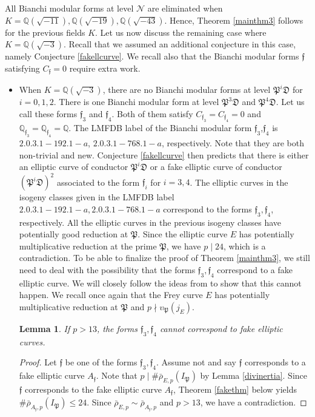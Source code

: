 \documentclass[]{article}
\newtheorem{lemma}{Lemma}
\newcommand {\QQ}{{\mathbb{Q}}}
\newcommand {\mfp}{{\mathfrak{P}}}
\begin{document}
All Bianchi modular forms at level $\mathcal{N}$ are eliminated when $K=\QQ(\sqrt{-11}),\QQ(\sqrt{-19}),\QQ(\sqrt{-43})$. Hence, Theorem \ref{mainthm3} follows for the previous fields $K$. Let us now discuss the remaining case where $K=\QQ(\sqrt{-3})$. Recall that we assumed an additional conjecture in this case, namely Conjecture \ref{fakellcurve}. We recall also that the Bianchi modular forms $\mathfrak{f}$ satisfying $C_\mathfrak{f}=0$ require extra work.

\begin{itemize}
    \item When $K=\QQ(\sqrt{-3})$, there are no Bianchi modular forms at level $\mfp^i\mathfrak{D}$ for $i=0,1,2$. There is one Bianchi modular form at level $\mfp^3\mathfrak{D}$ and $\mfp^4\mathfrak{D}$. Let us call these forms $\mathfrak{f}_3$ and $\mathfrak{f}_4$. Both of them satisfy $C_{\mathfrak{f}_3}=C_{\mathfrak{f}_4}=0$ and $\QQ_{\mathfrak{f}_3}=\QQ_{\mathfrak{f}_4}=\QQ$. The LMFDB label of the Bianchi modular form $\mathfrak{f}_3$,$\mathfrak{f}_4$ is $2.0.3.1-192.1-a$, $2.0.3.1-768.1-a$, respectively. Note that they are both non-trivial and new. Conjecture \ref{fakellcurve} then predicts that there is either an elliptic curve of conductor $\mfp^i\mathfrak{D}$ or a fake elliptic curve of conductor $(\mfp^i\mathfrak{D})^2$ associated to the form $\mathfrak{f}_i$ for $i=3,4$. The elliptic curves in the isogeny classes given in the LMFDB label $2.0.3.1-192.1-a,2.0.3.1-768.1-a$ correspond to the forms $\mathfrak{f}_3,\mathfrak{f}_4$, respectively. All the elliptic curves in the previous isogeny classes have potentially good reduction at $\mfp$. Since the elliptic curve $E$ has potentially multiplicative reduction at the prime $\mfp$, we have $p\mid 24$, which is a contradiction. To be able to finalize the proof of Theorem \ref{mainthm3}, we still need to deal with the possibility that the forms $\mathfrak{f}_3,\mathfrak{f}_4$ correspond to a fake elliptic curve. We will closely follow the ideas from \cite{csengun2018asymptotic} to show that this cannot happen. We recall once again that the Frey curve $E$ has potentially multiplicative reduction at $\mfp$ and $p\nmid v_{\mfp}(j_E)$.
    \begin{lemma}
        If $p> 13$, the forms $\mathfrak{f}_3,\mathfrak{f}_4$ cannot correspond to fake elliptic curves.
    \end{lemma}
    \begin{proof}
        Let $\mathfrak{f}$ be one of the forms $\mathfrak{f}_3,\mathfrak{f}_4$. Assume not and say $\mathfrak{f}$ corresponds to a fake elliptic curve $A_\mathfrak{f}$. Note that $p \mid \# \bar{\rho}_{E, p}\left(I_{\mfp}\right)$ by Lemma \ref{divinertia}. Since $\mathfrak{f}$ corresponds to the fake elliptic curve $A_\mathfrak{f}$, Theorem \ref{fakethm} below yields $\#\bar{\rho}_{A_\mathfrak{f}, p}\left(I_{\mfp}\right)\le 24$. Since $\bar{\rho}_{E, p}\sim \bar{\rho}_{A_\mathfrak{f}, p}$ and $p> 13$, we have a contradiction. 

\end{proof}
\end{itemize}
\end{document}
